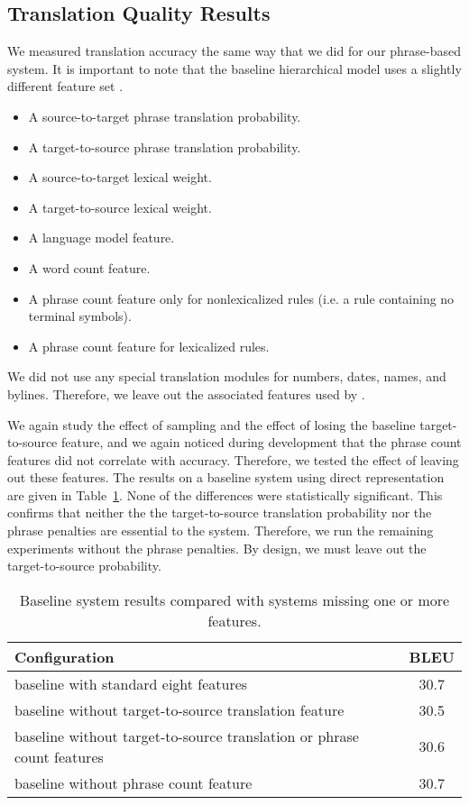 \subsection{Translation Quality Results}\label{sec:hiero-translation-results}

We measured translation accuracy the same way that
we did for our phrase-based system.  It is important to note that
the baseline hierarchical model uses a slightly different feature
set \citep{Chiang:2007:cl}.

\begin{itemize}
	\item A source-to-target phrase translation probability.
	\item A target-to-source phrase translation probability.
	\item A source-to-target lexical weight.
	\item A target-to-source lexical weight.
	\item A language model feature.
	\item A word count feature.
	\item A phrase count feature only for nonlexicalized rules (i.e. a rule containing no terminal symbols).
	\item A phrase count feature for lexicalized rules.
\end{itemize}

\noindent We did not use any special translation
modules for numbers, dates, names, and bylines.  Therefore,
we leave out the associated features used by \citet{Chiang:2007:cl}.

We again study the effect of sampling and the effect of 
losing the baseline target-to-source feature, and we again noticed
during development that the phrase count features did not
correlate with accuracy.  Therefore, we tested the effect of
leaving out these features.  The results on a baseline system
using direct representation are given in Table~\ref{table:hiero-baselines}.
None of the differences were statistically significant.  This
confirms that neither the the target-to-source translation
probability nor the phrase penalties are essential to the system.
Therefore, we run the remaining experiments without the 
phrase penalties.  By design, we must leave out the target-to-source
probability.

\begin{table}
	\begin{center}
	\begin{tabular}{lc}
		Configuration & BLEU \\ \hline
		baseline with standard eight features & 30.7 \\
		baseline without target-to-source translation feature & 30.5 \\
		baseline without target-to-source translation or phrase count features & 30.6 \\
		baseline without phrase count feature & 30.7 \\
	\end{tabular}
	\end{center}
	\caption{Baseline system results compared with systems missing one or more features.}
	\label{table:hiero-baselines}
\end{table}

